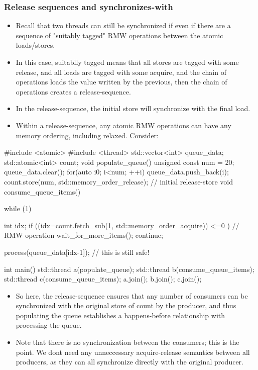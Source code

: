 \documentclass[11pt, a4paper]{article}
\theoremstyle{definition}
\theoremstyle{remark}
\begin{document}
\subsubsection{Release sequences and synchronizes-with}
\begin{itemize}
    \item Recall that two threads can still be synchronized if even if there are a sequence of "suitably tagged" RMW operations between the atomic loads/stores.
    \item In this case, suitablly tagged means that all stores are tagged with some release, and all loads are tagged with some acquire, and the chain of operations loads the value written by the previous, then the chain of operations creates a release-sequence.
    \item In the release-sequence, the initial store will synchronize with the final load.
    \item Within a release-sequence, any atomic RMW operations can have any memory ordering, including relaxed. Consider:
\end{itemize}
\begin{cppcode}
#include <atomic>
#include <thread>
std::vector<int> queue_data;
std::atomic<int> count;
void populate_queue() {
    unsigned const num = 20;
    queue_data.clear();
    for(auto i{0}; i<num; ++i) queue_data.push_back(i);
    count.store(num, std::memory_order_release); // initial release-store
}
void consume_queue_items() {
    while (1) {
        int idx;
        if ((idx=count.fetch_sub(1, std::memory_order_acquire)) <=0 ) { // RMW operation
            wait_for_more_items();
            continue;
        } 

        process(queue_data[idx-1]); // this is still safe!
    }
}
int main() {
    std::thread a(populate_queue);
    std::thread b(consume_queue_items);
    std::thread c(consume_queue_items);
    a.join();
    b.join();
    c.join();
}
\end{cppcode}
\begin{itemize}
    \item So here, the release-sequence ensures that any number of consumers can be synchronized with the original store of count by the producer, and thus populating the queue establishes a happens-before relationship with processing the queue.
    \item Note that there is no synchronization between the consumers; this is the point. We dont need any unneccessary acquire-release semantics between all producers, as they can all synchronize directly with the original producer.
\end{itemize}
\newpage
\end{document}
